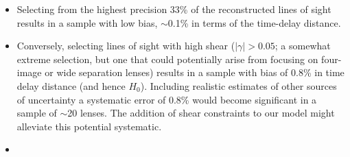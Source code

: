 \documentclass[useAMS,usenatbib,a4paper]{mn2e}
\begin{document}
\begin{itemize}
\item Selecting from the highest precision 33\% of the reconstructed lines of
sight results in a sample with low bias, $\sim$0.1\% in terms of the
time-delay distance. 

\item Conversely, selecting lines of sight with high shear ($|\gamma| > 0.05$; 
a somewhat extreme selection, but one that  could potentially arise from 
focusing on four-image or wide separation lenses) results in a sample with
bias of 0.8\% in time delay distance (and hence $H_0$). Including realistic estimates of other
sources of uncertainty a systematic error of 0.8\% would become significant in
a sample of $\sim$20 lenses. The addition of shear constraints to our model might
alleviate this potential systematic.

\item {}


\end{itemize}




\end{document}
